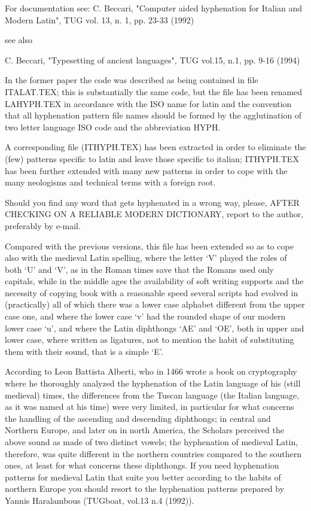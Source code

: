  For documentation see:
 C. Beccari, "Computer aided hyphenation for Italian and Modern
       Latin", TUG vol. 13, n. 1, pp. 23-33 (1992)

 see also

 C. Beccari, "Typesetting of ancient languages",
             TUG vol.15, n.1, pp. 9-16 (1994)

 In the former paper the code was described as being contained in file ITALAT.TEX;
 this is substantially the same code, but the file has been renamed LAHYPH.TEX
 in accordance with the ISO name for latin and the convention that all
 hyphenation pattern file names should be formed by the agglutination of
 two letter language ISO code and the abbreviation HYPH.

 A corresponding file (ITHYPH.TEX) has been extracted in order to eliminate
 the (few) patterns specific to latin and leave those specific to italian;
 ITHYPH.TEX has been further extended with many new patterns in order to
 cope with the many neologisms and technical terms with a foreign root.

 Should you find any word that gets hyphenated in a wrong way, please, AFTER
 CHECKING ON A RELIABLE MODERN DICTIONARY, report to the author, preferably
 by e-mail.

 Compared with the previous versions, this file has been extended so as to cope
 also with the medieval Latin spelling, where the letter `V' played the roles of both
 `U' and `V', as in the Roman times save that the Romans used only capitals, while
 in the middle ages the availability of soft writing supports and the necessity of
 copying book with a reasonable speed several scripts had evolved in (practically)
 all of which there was a lower case alphabet different from the upper case one,
 and where the lower case `v' had the rounded shape of our modern lower case `u',
 and where the Latin diphthongs `AE' and `OE', both in upper and lower case, where
 written as ligatures, not to mention the habit of substituting them with their sound,
 that is a simple `E'.

 According to Leon Battista Alberti, who in 1466 wrote a book on cryptography where
 he thoroughly analyzed the hyphenation of the Latin language of his (still medieval)
 times, the differences from the Tuscan language (the Italian language, as it was
 named at his time) were very limited, in particular for what concerns the handling
 of the ascending and descending diphthongs; in central and Northern Europe, and
 later on in north America, the Scholars perceived the above sound as made of two
 distinct vowels; the hyphenation of medieval Latin, therefore, was quite different
 in the northern countries compared to the southern ones, at least for what concerns
 these diphthongs. If you need hyphenation patterns for medieval Latin that suite you
 better according to the habits of northern Europe you should resort to the hyphenation
 patterns prepared by Yannis Haralambous (TUGboat, vol.13 n.4 (1992)).

